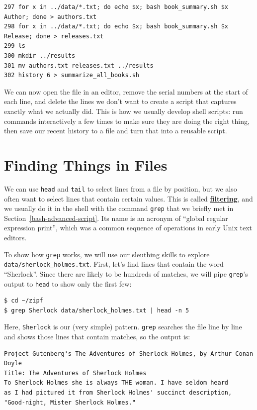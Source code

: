 \documentclass[
]{krantz}
\newcommand{\gref}[2]{\hyperlink{#2}{\textbf{#1}}}
\begin{document}
\begin{verbatim}
297 for x in ../data/*.txt; do echo $x; bash book_summary.sh $x Author; done > authors.txt
298 for x in ../data/*.txt; do echo $x; bash book_summary.sh $x Release; done > releases.txt
299 ls
300 mkdir ../results
301 mv authors.txt releases.txt ../results
302 history 6 > summarize_all_books.sh
\end{verbatim}

We can now open the file in an editor,
remove the serial numbers at the start of each line,
and delete the lines we don't want
to create a script that captures exactly what we actually did.
This is how we usually develop shell scripts:
run commands interactively a few times to make sure they are doing the right thing,
then save our recent history to a file and turn that into a reusable script.

\hypertarget{bash-advanced-grep}{%
\section{Finding Things in Files}\label{bash-advanced-grep}}

We can use \texttt{head} and \texttt{tail} to select lines from a file by position,
but we also often want to select lines that contain certain values.
This is called \gref{filtering}{filter},
and we usually do it in the shell with the command \texttt{grep}
that we briefly met in Section~\ref{bash-advanced-script}.
Its name is an acronym of ``global regular expression print'',
which was a common sequence of operations in early Unix text editors.

To show how \texttt{grep} works,
we will use our sleuthing skills to explore \texttt{data/sherlock\_holmes.txt}.
First,
let's find lines that contain the word ``Sherlock''.
Since there are likely to be hundreds of matches,
we will pipe \texttt{grep}'s output to \texttt{head} to show only the first few:

\begin{verbatim}
$ cd ~/zipf
$ grep Sherlock data/sherlock_holmes.txt | head -n 5
\end{verbatim}

Here, \texttt{Sherlock} is our (very simple) pattern.
\texttt{grep} searches the file line by line
and shows those lines that contain matches,
so the output is:

\begin{verbatim}
Project Gutenberg's The Adventures of Sherlock Holmes, by Arthur Conan Doyle
Title: The Adventures of Sherlock Holmes
To Sherlock Holmes she is always THE woman. I have seldom heard
as I had pictured it from Sherlock Holmes' succinct description,
"Good-night, Mister Sherlock Holmes."
\end{verbatim}
\end{document}
